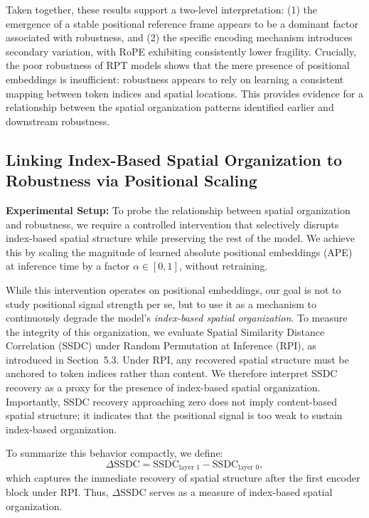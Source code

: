 \documentclass{article}
\begin{document}
    Taken together, these results support a two-level interpretation: (1) the emergence of a stable positional reference frame appears to be a dominant factor associated with robustness, and (2) the specific encoding mechanism introduces secondary variation, with RoPE exhibiting consistently lower fragility.
    Crucially, the poor robustness of RPT models shows that the mere presence of positional embeddings is insufficient: robustness appears to rely on learning a consistent mapping between token indices and spatial locations. This provides evidence for a relationship between the spatial organization patterns identified earlier and downstream robustness.

  \subsection{Linking Index-Based Spatial Organization to Robustness via Positional Scaling}



    \textbf{Experimental Setup:}
    To probe the relationship between spatial organization and robustness, we require a controlled intervention that selectively disrupts index-based spatial structure while preserving the rest of the model. We achieve this by scaling the magnitude of learned absolute positional embeddings (APE) at inference time by a factor $\alpha \in [0,1]$, without retraining.

    While this intervention operates on positional embeddings, our goal is not to study positional signal strength per se, but to use it as a mechanism to continuously degrade the model’s \emph{index-based spatial organization}. To measure the integrity of this organization, we evaluate Spatial Similarity Distance Correlation (SSDC) under Random Permutation at Inference (RPI), as introduced in Section~5.3. Under RPI, any recovered spatial structure must be anchored to token indices rather than content. We therefore interpret SSDC recovery as a proxy for the presence of index-based spatial organization. Importantly, SSDC recovery approaching zero does not imply content-based spatial structure; it indicates that the positional signal is too weak to sustain index-based organization.

    To summarize this behavior compactly, we define:
    \[
    \Delta \mathrm{SSDC} = \mathrm{SSDC}_{\text{layer }1} - \mathrm{SSDC}_{\text{layer }0},
    \]
    which captures the immediate recovery of spatial structure after the first encoder block under RPI. Thus, $\Delta \mathrm{SSDC}$ serves as a measure of index-based spatial organization.
\end{document}

